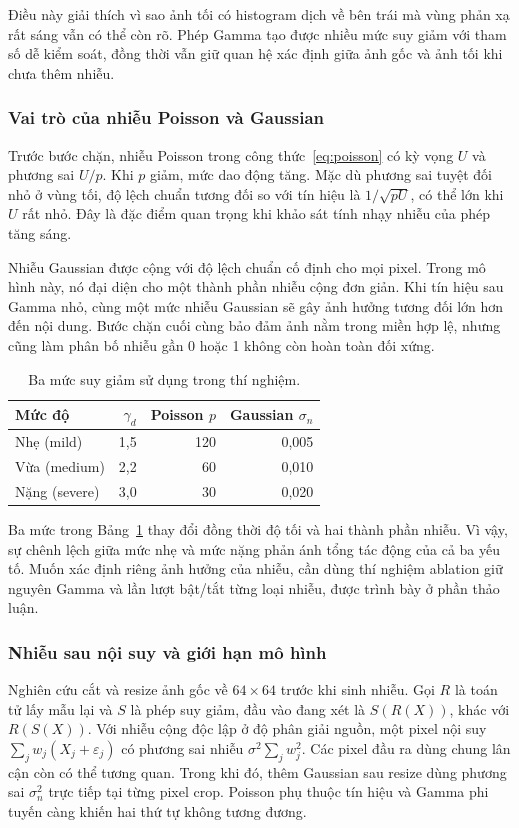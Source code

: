 Điều này giải thích vì sao ảnh tối có histogram dịch về bên trái mà vùng phản xạ rất sáng vẫn có thể còn rõ. Phép Gamma tạo được nhiều mức suy giảm với tham số dễ kiểm soát, đồng thời vẫn giữ quan hệ xác định giữa ảnh gốc và ảnh tối khi chưa thêm nhiễu.

\subsubsection{Vai trò của nhiễu Poisson và Gaussian}
Trước bước chặn, nhiễu Poisson trong công thức~\eqref{eq:poisson} có kỳ vọng $U$ và phương sai $U/p$. Khi $p$ giảm, mức dao động tăng. Mặc dù phương sai tuyệt đối nhỏ ở vùng tối, độ lệch chuẩn tương đối so với tín hiệu là $1/\sqrt{pU}$, có thể lớn khi $U$ rất nhỏ. Đây là đặc điểm quan trọng khi khảo sát tính nhạy nhiễu của phép tăng sáng.

Nhiễu Gaussian được cộng với độ lệch chuẩn cố định cho mọi pixel. Trong mô hình này, nó đại diện cho một thành phần nhiễu cộng đơn giản. Khi tín hiệu sau Gamma nhỏ, cùng một mức nhiễu Gaussian sẽ gây ảnh hưởng tương đối lớn hơn đến nội dung. Bước chặn cuối cùng bảo đảm ảnh nằm trong miền hợp lệ, nhưng cũng làm phân bố nhiễu gần 0 hoặc 1 không còn hoàn toàn đối xứng.

\par
\begin{table}[htbp]
\centering
\caption{Ba mức suy giảm sử dụng trong thí nghiệm.}
\begin{tabular}{lrrr}
\toprule
Mức độ & $\gamma_d$ & Poisson $p$ & Gaussian $\sigma_n$ \\
\midrule
Nhẹ (mild) & 1,5 & 120 & 0,005 \\
Vừa (medium) & 2,2 & 60 & 0,010 \\
Nặng (severe) & 3,0 & 30 & 0,020 \\
\bottomrule
\end{tabular}
\label{tab:degrade}
\end{table}\par


Ba mức trong Bảng~\ref{tab:degrade} thay đổi đồng thời độ tối và hai thành phần nhiễu. Vì vậy, sự chênh lệch giữa mức nhẹ và mức nặng phản ánh tổng tác động của cả ba yếu tố. Muốn xác định riêng ảnh hưởng của nhiễu, cần dùng thí nghiệm ablation giữ nguyên Gamma và lần lượt bật/tắt từng loại nhiễu, được trình bày ở phần thảo luận.

\subsubsection{Nhiễu sau nội suy và giới hạn mô hình}
Nghiên cứu cắt và resize ảnh gốc về $64\times64$ trước khi sinh nhiễu. Gọi $R$ là toán tử lấy mẫu lại và $S$ là phép suy giảm, đầu vào đang xét là $S(R(X))$, khác với $R(S(X))$. Với nhiễu cộng độc lập ở độ phân giải nguồn, một pixel nội suy $\sum_j w_j(X_j+\varepsilon_j)$ có phương sai nhiễu $\sigma^2\sum_j w_j^2$. Các pixel đầu ra dùng chung lân cận còn có thể tương quan. Trong khi đó, thêm Gaussian sau resize dùng phương sai $\sigma_n^2$ trực tiếp tại từng pixel crop. Poisson phụ thuộc tín hiệu và Gamma phi tuyến càng khiến hai thứ tự không tương đương.

